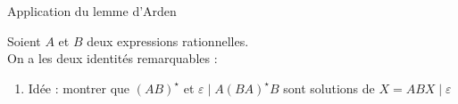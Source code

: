 
\begingroup

\begin{frame}{Application du lemme d'Arden}

  Soient $A$ et $B$ deux expressions rationnelles. \\On a les deux identités remarquables : 
  \begin{enumerate}
  \item\vspace{3mm} 
    
    \begin{center}
      \alert{Idée : montrer que $(AB)^\star$ et $\varepsilon \mid  A(BA)^\star B$ sont solutions de $X = AB X \mid \varepsilon$}
    \end{center}
    

\end{enumerate}
\end{frame}

